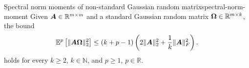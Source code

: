 \begin{lemma}{Spectral norm moments of non-standard Gaussian random matrix}{spectral-norm-moment}
    Given $\boldsymbol{A} \in \mathbb{R}^{m \times m}$ and a standard Gaussian random matrix $\boldsymbol{\Omega} \in \mathbb{R}^{m \times k}$, the bound
    \begin{equation}
        \mathbb{E}^{p}\left[ \lVert \boldsymbol{A} \boldsymbol{\Omega} \rVert _2^2 \right]
        \leq  (k + p-1) \left( 2 \lVert \boldsymbol{A} \rVert _2^2 + \frac{1}{k} \lVert \boldsymbol{A} \rVert _F^2 \right).
    \end{equation}
    holds for every $k \ge 2$, $k\in \mathbb{N}$, and $p \ge 1$, $p\in \mathbb R$.
\end{lemma}
